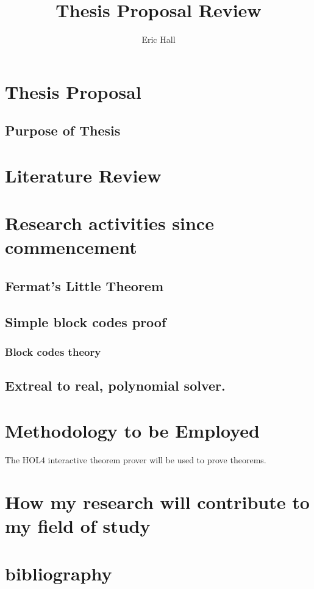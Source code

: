 \documentclass{article}
\title{Thesis Proposal Review}
\author{Eric Hall}
\begin{document}
\maketitle

\section{Thesis Proposal}

 	 
\subsection{Purpose of Thesis}

\section{Literature Review}

\section{Research activities since commencement}

\subsection {Fermat's Little Theorem}

\subsection {Simple block codes proof}

\subsubsection {Block codes theory}

\subsubsection{}	


\subsection {Extreal to real, polynomial solver.}


\section{Methodology to be Employed}

The HOL4 interactive theorem prover will be used to prove theorems.

\section{How my research will contribute to my field of study}

\section{bibliography}
\end{document}
